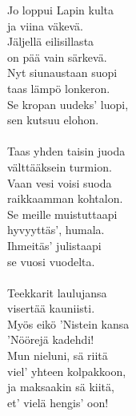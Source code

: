 
Jo loppui Lapin kulta \\ ja viina väkevä. \\ Jäljellä eilisillasta \\ on pää vain särkevä. \\ Nyt siunaustaan suopi \\ taas lämpö lonkeron. \\ Se kropan uudeks' luopi, \\ sen kutsuu elohon. \\ \hspace{10mm} \\ Taas yhden taisin juoda \\ välttääksein turmion. \\ Vaan vesi voisi suoda \\ raikkaamman kohtalon. \\ Se meille muistuttaapi \\ hyvyyttäs', humala. \\ Ihmeitäs' julistaapi \\ se vuosi vuodelta. \\ \hspace{10mm} \\ Teekkarit laulujansa \\ visertää kauniisti. \\ Myös eikö 'Nistein kansa \\ 'Nöörejä kadehdi! \\ Mun nieluni, sä riitä \\ viel' yhteen kolpakkoon, \\ ja maksaakin sä kiitä, \\ et' vielä hengis' oon!